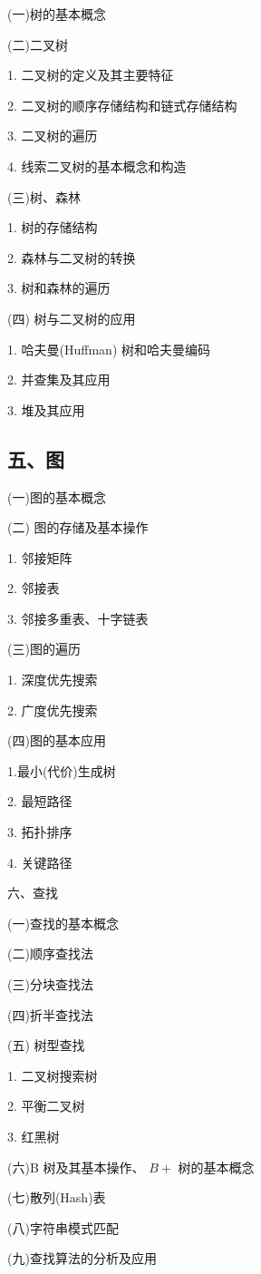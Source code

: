\documentclass[10pt]{article}
\begin{document}
(一)树的基本概念

(二)二叉树

1. 二叉树的定义及其主要特征

2. 二叉树的顺序存储结构和链式存储结构

3. 二叉树的遍历

4. 线索二叉树的基本概念和构造

(三)树、森林

1. 树的存储结构 

2. 森林与二叉树的转换 

3. 树和森林的遍历 

(四) 树与二叉树的应用 

1. 哈夫曼(Huffman) 树和哈夫曼编码 

2. 并查集及其应用 

3. 堆及其应用

\subsection*{五、图}

(一)图的基本概念

(二) 图的存储及基本操作

1. 邻接矩阵

2. 邻接表

3. 邻接多重表、十字链表

(三)图的遍历

1. 深度优先搜索

2. 广度优先搜索

(四)图的基本应用

1.最小(代价)生成树

2. 最短路径

3. 拓扑排序

4. 关键路径

六、查找

(一)查找的基本概念

(二)顺序查找法

(三)分块查找法

(四)折半查找法

(五) 树型查找

1. 二叉树搜索树

2. 平衡二叉树

3. 红黑树

(六)B 树及其基本操作、 \(B +\) 树的基本概念

(七)散列(Hash)表

(八)字符串模式匹配

(九)查找算法的分析及应用
\end{document}
